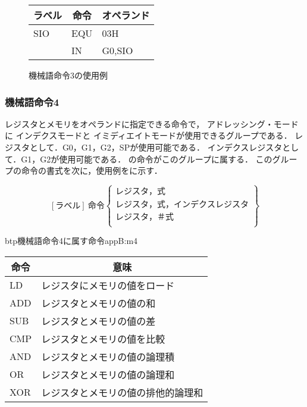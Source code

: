 \begin{figure}[btp]
\begin{center}
{\tt\small\begin{tabular}{|l|l|l|}\hline
\multicolumn{1}{|c|}{ラベル} & 
        \multicolumn{1}{c|}{命令} & \multicolumn{1}{c|}{オペランド} \\\hline
SIO  & EQU &  03H \\
     & IN  &  G0,SIO \\\hline
\end{tabular}}
\caption{機械語命令3の使用例}
\label{fig:appB:m3ex}
\end{center}
\end{figure}

\subsubsection{機械語命令4}
レジスタとメモリをオペランドに指定できる命令で，
アドレッシング・モードに
インデクスモードと
イミディエイトモードが使用できるグループである．
レジスタとして．G0，G1，G2，SPが使用可能である．
インデクスレジスタとして．G1，G2が使用可能である．
の命令がこのグループに属する．
このグループの命令の書式を次に，使用例をに示す．

{\small\[ %
[ラベル]~命令\left\{
  \begin{array}{c}
   レジスタ，式 \\
   レジスタ，式，インデクスレジスタ \\
   レジスタ，＃式 \\
  \end{array}  
 \right\}
 \]}

\begin{mytable}{btp}{機械語命令4に属す命令}{appB:m4}
{\small\begin{tabular}{l|l}
\hline\hline
\multicolumn{1}{c|}{命令} & \multicolumn{1}{c}{意味} \\\hline
LD & レジスタにメモリの値をロード \\
ADD & レジスタとメモリの値の和 \\
SUB & レジスタとメモリの値の差 \\
CMP & レジスタとメモリの値を比較 \\
AND & レジスタとメモリの値の論理積 \\
OR & レジスタとメモリの値の論理和 \\
XOR & レジスタとメモリの値の排他的論理和
\end{tabular}}
\end{mytable}

